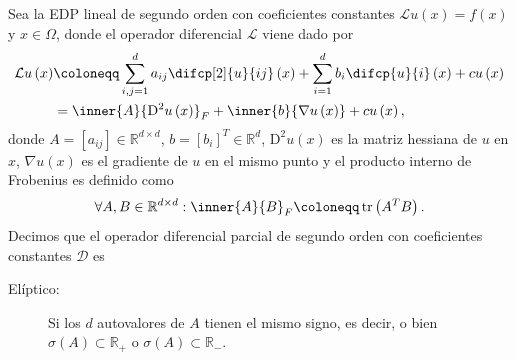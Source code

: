 \begin{definition}
    Sea la EDP lineal de segundo orden con coeficientes constantes
    \begin{math}
        \mathcal{L}u\left(x\right)=
        f\left(x\right)
    \end{math}
    y $x\in\Omega$, donde el operador diferencial $\mathcal{L}$ viene
    dado por
    \begin{align*}
        \mathcal{L}
        u\left(x\right) & \coloneqq
        \sum_{i,j=1}^{d}
        a_{ij}
        \difcp[2]{u}{ij}\left(x\right)+
        \sum_{i=1}^{d}
        b_{i}
        \difcp{u}{i}\left(x\right)+
        cu\left(x\right)            \\
                        & =
        {
        \inner{A}{\mathrm{D}^{2}u\left(x\right)}
        }_{F}+
        \inner{b}{\nabla u\left(x\right)}+
        c
        u\left(x\right),
    \end{align*}
    donde $A=\left[a_{ij}\right]\in\mathbb{R}^{d\times d}$,
    \begin{math}
        b={\left[b_{i}\right]}^{T}\in\mathbb{R}^{d}
    \end{math},
    \begin{math}
        \mathrm{D}^{2}u\left(x\right)
    \end{math}
    es la matriz hessiana de $u$ en $x$,
    \begin{math}
        \nabla u\left(x\right)
    \end{math}
    es el gradiente de $u$ en el mismo punto y el producto interno de
    Frobenius es definido como
    \begin{equation*}
        \forall A,B\in\mathbb{R}^{d\times d}:
        {\inner{A}{B}}_{F}\coloneqq
        \operatorname{tr}
        \left(A^{T}B\right).
    \end{equation*}
    Decimos que el operador diferencial parcial de segundo orden con
    coeficientes constantes $\mathcal{D}$ es
    \begin{description}
        \item[Elíptico:]

              Si los $d$ autovalores de $A$ tienen el mismo signo, es
              decir, o bien
              \begin{math}
                  \sigma\left(A\right)\subset\mathbb{R}_{+}
              \end{math}
              o
              \begin{math}
                  \sigma\left(A\right)\subset\mathbb{R}_{-}
              \end{math}.


\end{description}
\end{definition}
